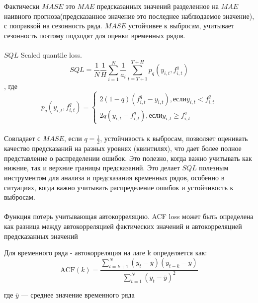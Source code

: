Фактически $MASE$ это $MAE$ предсказанных значений разделенное на $MAE$ наивного прогноза(предсказанное значение это последнее наблюдаемое значение), с поправкой на сезонность ряда.
$MASE$ устойчивее к выбросам, учитывает сезонность поэтому подходят для оценки временных рядов.\\
\\
$SQL$ Scaled quantile loss.
$$SQL = \frac{1}{N} \frac{1}{H} \sum_{i = 1}^{N} \frac{1}{a_{i}}\sum_{t = T + 1} ^ {T + H}p_{q}(y_{i,t}, f_{i,t}^{q})$$, где
$$p_{q}(y_{i,t}, f_{i,t}^{q}) = \begin{cases}
    2(1 - q)(f_{i,t}^q - y_{i,t}), если y_{i,t} < f_{i,t}^q\\
    2q(y_{i,t} - f_{i,t}^q ),если y_{i,t} \geq f_{i,t}^q
\end{cases}$$
\\
Совпадает с $MASE$, если $q = \frac{1}{2}$, устойчивость к выбросам, позволяет оценивать качество предсказаний на разных уровнях (квинтилях), что дает более полное представление о распределении ошибок. Это полезно, когда важно учитывать как нижние, так и верхние границы предсказаний. Это делает $SQL$ полезным инструментом для анализа и предсказания временных рядов, особенно в ситуациях, когда важно учитывать распределение ошибок и устойчивость к выбросам.\\
\\
Функция потерь учитывающая автокорреляцию. ACF loss может быть определена как разница между автокорреляцией фактических значений и автокорреляцией предсказанных значений

Для временного ряда - автокорреляция на лаге k определяется как:
    \[
   \text{ACF}(k) = \frac{\sum_{t=k+1}^{N} (y_t - \bar{y})(y_{t-k} - \bar{y})}{\sum_{t=1}^{N} (y_t - \bar{y})^2}
   \]

   где \( \bar{y} \) — среднее значение временного ряда\\

